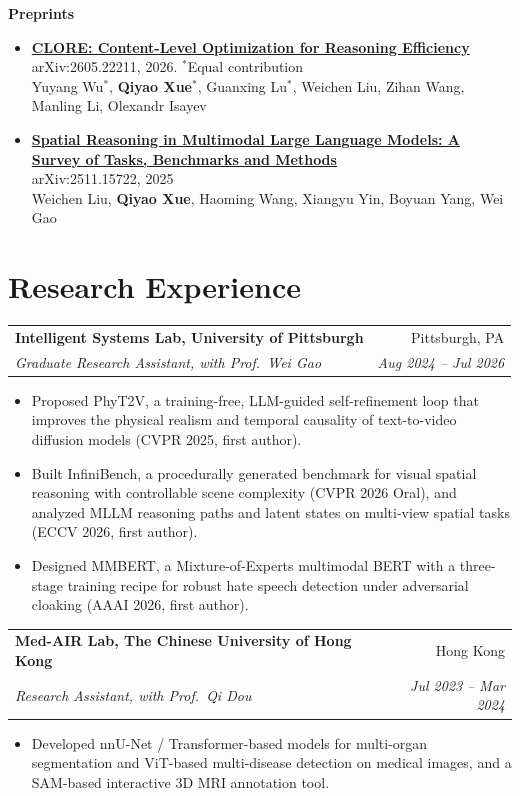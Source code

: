 \documentclass[11pt,letterpaper]{article}
\makeatletter
\newcommand{\entry}[4]{%
  \begin{tabularx}{\linewidth}{@{}X r@{}}
    \textbf{#1} & #2 \\
    \textit{#3} & \textit{#4} \\
  \end{tabularx}\vspace{0.15em}}
\newcommand{\me}{\textbf{Qiyao Xue}}
\newcommand{\pub}[3]{\item {\hypersetup{urlcolor=accent}\textbf{#2}}\\ #3\\ #1}
\makeatother
\begin{document}
\textbf{Preprints}
\begin{itemize}[itemsep=0.3em]
  \pub{Yuyang Wu$^*$, \me$^*$, Guanxing Lu$^*$, Weichen Liu, Zihan Wang, Manling Li, Olexandr Isayev}
      {\href{https://arxiv.org/pdf/2605.22211}{CLORE: Content-Level Optimization for Reasoning Efficiency}}
      {arXiv:2605.22211, 2026. \quad $^*$Equal contribution}
  \pub{Weichen Liu, \me, Haoming Wang, Xiangyu Yin, Boyuan Yang, Wei Gao}
      {\href{https://arxiv.org/pdf/2511.15722}{Spatial Reasoning in Multimodal Large Language Models: A Survey of Tasks, Benchmarks and Methods}}
      {arXiv:2511.15722, 2025}
\end{itemize}

\section{Research Experience}
\entry{Intelligent Systems Lab, University of Pittsburgh}{Pittsburgh, PA}
      {Graduate Research Assistant, with Prof.\ Wei Gao}{Aug 2024 -- Jul 2026}
\vspace{-0.4em}
\begin{itemize}
  \item Proposed PhyT2V, a training-free, LLM-guided self-refinement loop that improves the physical realism and temporal
        causality of text-to-video diffusion models (CVPR 2025, first author).
  \item Built InfiniBench, a procedurally generated benchmark for visual spatial reasoning with controllable scene
        complexity (CVPR 2026 Oral), and analyzed MLLM reasoning paths and latent states on multi-view spatial tasks (ECCV 2026, first author).
  \item Designed MMBERT, a Mixture-of-Experts multimodal BERT with a three-stage training recipe for robust hate speech
        detection under adversarial cloaking (AAAI 2026, first author).
\end{itemize}
\vspace{0.3em}
\entry{Med-AIR Lab, The Chinese University of Hong Kong}{Hong Kong}
      {Research Assistant, with Prof.\ Qi Dou}{Jul 2023 -- Mar 2024}
\vspace{-0.4em}
\begin{itemize}
  \item Developed nnU-Net / Transformer-based models for multi-organ segmentation and ViT-based multi-disease detection
        on medical images, and a SAM-based interactive 3D MRI annotation tool.
\end{itemize}
\end{document}
